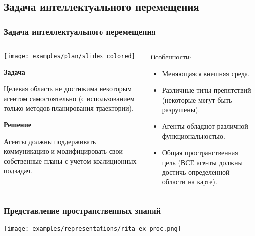 \documentclass[default]{beamer}
\begin{document}
	\subsection{Задача интеллектуального перемещения}
	\begin{frame}
		\frametitle{Задача интеллектуального перемещения}
		
		\begin{columns}
			\begin{column}{0.55\textwidth}
				\begin{center}
					\texttt{[image: examples/plan/slides\_colored]}
				\end{center}
				\vspace{-7pt}
				\small
				\textbf{Задача}
				
				Целевая область не достижима некоторым агентом самостоятельно (с использованием только методов планирования траектории).
				
				\textbf{Решение}
				
				Агенты должны поддерживать коммуникацию и модифицировать свои собственные планы с учетом коалиционных подзадач.
				
			\end{column}
			\begin{column}{0.45\textwidth}
				Особенности:
				\begin{itemize}
					\item Меняющаяся внешняя среда.
					\item Различные типы препятствий (некоторые могут быть разрушены).
					\item Агенты обладают различной функциональностью.
					\item Общая пространственная цель (ВСЕ агенты должны достичь определенной области на карте).
				\end{itemize}
			\end{column}
		\end{columns}
	\end{frame}
	
	\begin{frame}
		\frametitle{Представление пространственных знаний}
		
		\texttt{[image: examples/representations/rita\_ex\_proc.png]}
		
		\nocite{*}
		\printbibliography[keyword={planknow}, resetnumbers=true]
	\end{frame}
\end{document}
